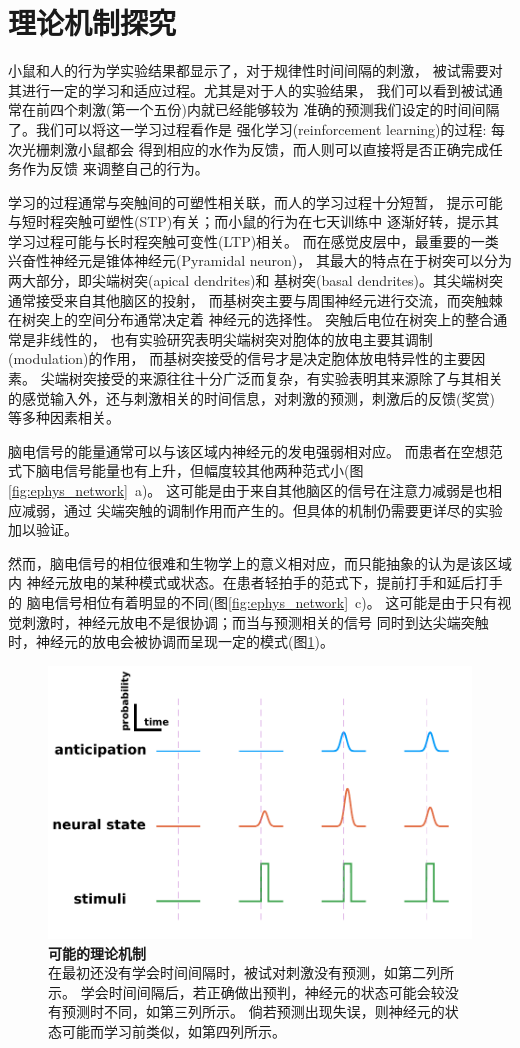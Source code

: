 \section{理论机制探究}

小鼠和人的行为学实验结果都显示了，对于规律性时间间隔的刺激，
被试需要对其进行一定的学习和适应过程。尤其是对于人的实验结果，
我们可以看到被试通常在前四个刺激(第一个五份)内就已经能够较为
准确的预测我们设定的时间间隔了。我们可以将这一学习过程看作是
强化学习(reinforcement learning)的过程: 每次光栅刺激小鼠都会
得到相应的水作为反馈，而人则可以直接将是否正确完成任务作为反馈
来调整自己的行为。

学习的过程通常与突触间的可塑性相关联，而人的学习过程十分短暂，
提示可能与短时程突触可塑性(STP)有关；而小鼠的行为在七天训练中
逐渐好转，提示其学习过程可能与长时程突触可变性(LTP)相关。
而在感觉皮层中，最重要的一类兴奋性神经元是锥体神经元(Pyramidal neuron)，
其最大的特点在于树突可以分为两大部分，即尖端树突(apical dendrites)和
基树突(basal dendrites)。其尖端树突通常接受来自其他脑区的投射，
而基树突主要与周围神经元进行交流，而突触棘在树突上的空间分布通常决定着
神经元的选择性\cite{mel2017synaptic}。
突触后电位在树突上的整合通常是非线性的，
也有实验研究表明尖端树突对胞体的放电主要其调制(modulation)的作用，
而基树突接受的信号才是决定胞体放电特异性的主要因素\cite{caze2017dendrites,branco2011synaptic}。
尖端树突接受的来源往往十分广泛而复杂，有实验表明其来源除了与其相关
的感觉输入外，还与刺激相关的时间信息，对刺激的预测，刺激后的反馈(奖赏)
等多种因素相关\cite{lacefield2019reinforcement}。

脑电信号的能量通常可以与该区域内神经元的发电强弱相对应。
而患者在空想范式下脑电信号能量也有上升，但幅度较其他两种范式小(图\ref{fig:ephys_network}~a)。
这可能是由于来自其他脑区的信号在注意力减弱是也相应减弱，通过
尖端突触的调制作用而产生的。但具体的机制仍需要更详尽的实验加以验证。

然而，脑电信号的相位很难和生物学上的意义相对应，而只能抽象的认为是该区域内
神经元放电的某种模式或状态。在患者轻拍手的范式下，提前打手和延后打手的
脑电信号相位有着明显的不同(图\ref{fig:ephys_network}~c)。
这可能是由于只有视觉刺激时，神经元放电不是很协调；而当与预测相关的信号
同时到达尖端突触时，神经元的放电会被协调而呈现一定的模式(图\ref{fig:theory})。

\begin{figure}[h]
    \centering
    \includegraphics[width=\textwidth]{src/figures/theory.pdf}
    \caption{\textbf{可能的理论机制}\\
    在最初还没有学会时间间隔时，被试对刺激没有预测，如第二列所示。
    学会时间间隔后，若正确做出预判，神经元的状态可能会较没有预测时不同，如第三列所示。
    倘若预测出现失误，则神经元的状态可能而学习前类似，如第四列所示。}
    \label{fig:theory}
\end{figure}


